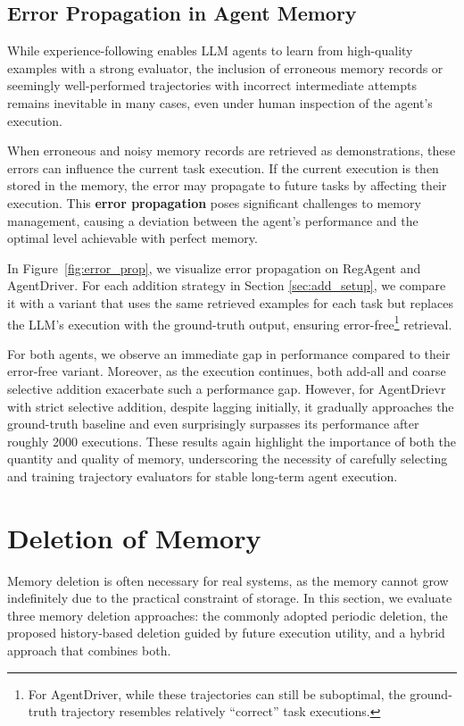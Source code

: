 \documentclass[11pt]{article}
\theoremstyle{plain}
\theoremstyle{definition}
\begin{document}
\subsection{Error Propagation in Agent Memory}
\label{sec:erro_prop}

While experience-following enables LLM agents to learn from high-quality examples with a strong evaluator, the inclusion of erroneous memory records or seemingly well-performed trajectories with incorrect intermediate attempts remains inevitable in many cases, even under human inspection of the agent’s execution.

When erroneous and noisy memory records are retrieved as demonstrations, these errors can influence the current task execution. If the current execution is then stored in the memory, the error may propagate to future tasks by affecting their execution.
This \textbf{error propagation} poses significant challenges to memory management, causing a deviation between the agent's performance and the optimal level achievable with perfect memory.

In Figure~\ref{fig:error_prop}, we visualize error propagation on RegAgent and AgentDriver.
For each addition strategy in Section \ref{sec:add_setup}, we compare it with a variant that uses the same retrieved examples for each task but replaces the LLM’s execution with the ground-truth output, ensuring error-free\footnote{For AgentDriver, while these trajectories can still be suboptimal, the ground-truth trajectory resembles relatively ``correct'' task executions.} retrieval.

For both agents, we observe an immediate gap in performance compared to their error-free variant.
Moreover, as the execution continues, both add-all and coarse selective addition 
exacerbate such a performance gap.
However, for AgentDrievr with strict selective addition, despite lagging initially, it gradually approaches the ground-truth baseline and even surprisingly surpasses its performance after roughly 2000 executions. 
These results again highlight the importance of both the quantity and quality of memory, underscoring the necessity of carefully selecting and training trajectory evaluators for stable long-term agent execution.


\section{Deletion of Memory}
\label{sec:deletion}
Memory deletion is often necessary for real systems, as the memory cannot grow indefinitely due to the practical constraint of storage.
In this section, we evaluate three memory deletion approaches: the commonly adopted periodic deletion, the proposed history-based deletion guided by future execution utility, and a hybrid approach that combines both.
\end{document}

